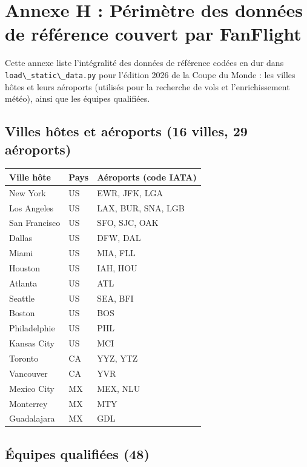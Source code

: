\documentclass[11pt,a4paper]{report}
\newcommand{\code}[1]{\lstinline{#1}}
\begin{document}
\section*{Annexe H : Périmètre des données de référence couvert par FanFlight}

Cette annexe liste l'intégralité des données de référence codées en dur dans \code{load\_static\_data.py} pour l'édition 2026 de la Coupe du Monde : les villes hôtes et leurs aéroports (utilisés pour la recherche de vols et l'enrichissement météo), ainsi que les équipes qualifiées.

\subsection*{Villes hôtes et aéroports (16 villes, 29 aéroports)}

\begin{longtable}{p{3.3cm}p{1.6cm}p{9cm}}
\toprule
\textbf{Ville hôte} & \textbf{Pays} & \textbf{Aéroports (code IATA)} \\
\midrule
\endhead
New York & US & EWR, JFK, LGA \\
Los Angeles & US & LAX, BUR, SNA, LGB \\
San Francisco & US & SFO, SJC, OAK \\
Dallas & US & DFW, DAL \\
Miami & US & MIA, FLL \\
Houston & US & IAH, HOU \\
Atlanta & US & ATL \\
Seattle & US & SEA, BFI \\
Boston & US & BOS \\
Philadelphie & US & PHL \\
Kansas City & US & MCI \\
Toronto & CA & YYZ, YTZ \\
Vancouver & CA & YVR \\
Mexico City & MX & MEX, NLU \\
Monterrey & MX & MTY \\
Guadalajara & MX & GDL \\
\bottomrule
\end{longtable}

\subsection*{Équipes qualifiées (48)}
\end{document}
